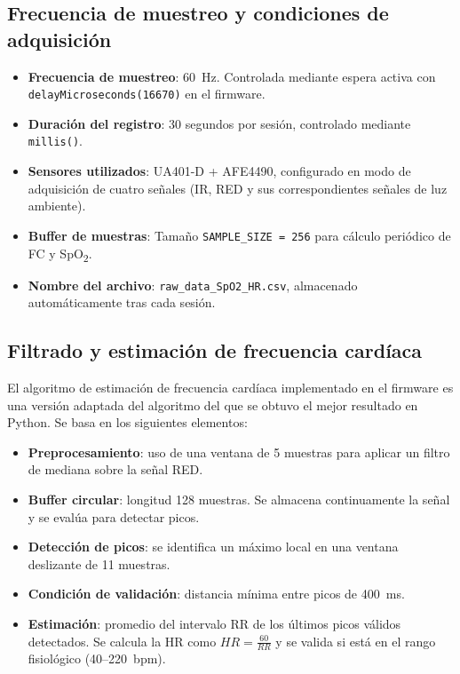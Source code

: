 \subsection{Frecuencia de muestreo y condiciones de adquisición}

\begin{itemize}
    \item \textbf{Frecuencia de muestreo}: 60~Hz. Controlada mediante espera activa con \texttt{delayMicroseconds(16670)} en el firmware.
    \item \textbf{Duración del registro}: 30 segundos por sesión, controlado mediante \texttt{millis()}.
    \item \textbf{Sensores utilizados}: UA401-D + AFE4490, configurado en modo de adquisición de cuatro señales (IR, RED y sus correspondientes señales de luz ambiente).
    \item \textbf{Buffer de muestras}: Tamaño \texttt{SAMPLE\_SIZE = 256} para cálculo periódico de FC y SpO\textsubscript{2}.
    \item \textbf{Nombre del archivo}: \texttt{raw\_data\_SpO2\_HR.csv}, almacenado automáticamente tras cada sesión.
\end{itemize}

\subsection{Filtrado y estimación de frecuencia cardíaca }

El algoritmo de estimación de frecuencia cardíaca implementado en el firmware es una versión adaptada del algoritmo del que se obtuvo el mejor resultado en Python. Se basa en los siguientes elementos:

\begin{itemize}
    \item \textbf{Preprocesamiento}: uso de una ventana de 5 muestras para aplicar un filtro de mediana sobre la señal RED.
    \item \textbf{Buffer circular}: longitud 128 muestras. Se almacena continuamente la señal y se evalúa para detectar picos.
    \item \textbf{Detección de picos}: se identifica un máximo local en una ventana deslizante de 11 muestras.
    \item \textbf{Condición de validación}: distancia mínima entre picos de 400~ms.
    \item \textbf{Estimación}: promedio del intervalo RR de los últimos picos válidos detectados. Se calcula la HR como \( HR = \frac{60}{RR} \) y se valida si está en el rango fisiológico (40--220~bpm).
\end{itemize}

